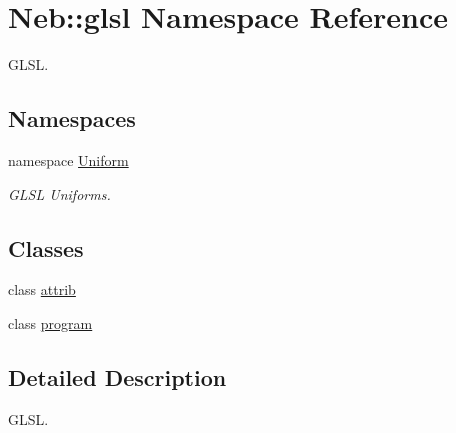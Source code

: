 \hypertarget{namespaceNeb_1_1glsl}{\section{\-Neb\-:\-:glsl \-Namespace \-Reference}
\label{namespaceNeb_1_1glsl}
}


\-G\-L\-S\-L.  


\subsection*{\-Namespaces}
\begin{DoxyCompactItemize}
\item 
namespace \hyperlink{namespaceNeb_1_1glsl_1_1Uniform}{\-Uniform}
\begin{DoxyCompactList}\small\item\em \-G\-L\-S\-L \-Uniforms. \end{DoxyCompactList}\end{DoxyCompactItemize}
\subsection*{\-Classes}
\begin{DoxyCompactItemize}
\item 
class \hyperlink{classNeb_1_1glsl_1_1attrib}{attrib}
\item 
class \hyperlink{classNeb_1_1glsl_1_1program}{program}
\end{DoxyCompactItemize}


\subsection{\-Detailed \-Description}
\-G\-L\-S\-L. 